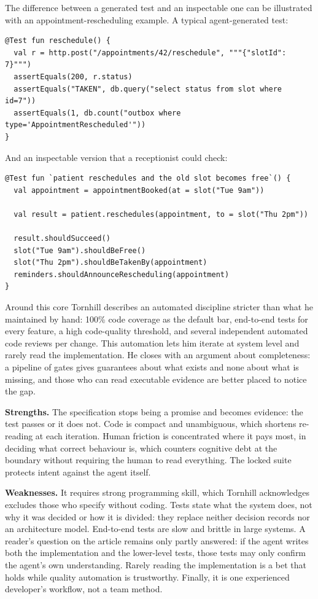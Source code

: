 \documentclass[11pt]{article}
\begin{document}
The difference between a generated test and an inspectable one can be illustrated with an appointment-rescheduling example. A typical agent-generated test:

\begin{verbatim}
@Test fun reschedule() {
  val r = http.post("/appointments/42/reschedule", """{"slotId": 7}""")
  assertEquals(200, r.status)
  assertEquals("TAKEN", db.query("select status from slot where id=7"))
  assertEquals(1, db.count("outbox where type='AppointmentRescheduled'"))
}
\end{verbatim}

And an inspectable version that a receptionist could check:

\begin{verbatim}
@Test fun `patient reschedules and the old slot becomes free`() {
  val appointment = appointmentBooked(at = slot("Tue 9am"))

  val result = patient.reschedules(appointment, to = slot("Thu 2pm"))

  result.shouldSucceed()
  slot("Tue 9am").shouldBeFree()
  slot("Thu 2pm").shouldBeTakenBy(appointment)
  reminders.shouldAnnounceRescheduling(appointment)
}
\end{verbatim}

Around this core Tornhill describes an automated discipline stricter than what he maintained by hand: 100\% code coverage as the default bar, end-to-end tests for every feature, a high code-quality threshold, and several independent automated code reviews per change. This automation lets him iterate at system level and rarely read the implementation. He closes with an argument about completeness: a pipeline of gates gives guarantees about what exists and none about what is missing, and those who can read executable evidence are better placed to notice the gap.

\textbf{Strengths.} The specification stops being a promise and becomes evidence: the test passes or it does not. Code is compact and unambiguous, which shortens re-reading at each iteration. Human friction is concentrated where it pays most, in deciding what correct behaviour is, which counters cognitive debt at the boundary without requiring the human to read everything. The locked suite protects intent against the agent itself.

\textbf{Weaknesses.} It requires strong programming skill, which Tornhill acknowledges excludes those who specify without coding. Tests state what the system does, not why it was decided or how it is divided: they replace neither decision records nor an architecture model. End-to-end tests are slow and brittle in large systems. A reader's question on the article remains only partly answered: if the agent writes both the implementation and the lower-level tests, those tests may only confirm the agent's own understanding. Rarely reading the implementation is a bet that holds while quality automation is trustworthy. Finally, it is one experienced developer's workflow, not a team method.
\end{document}

